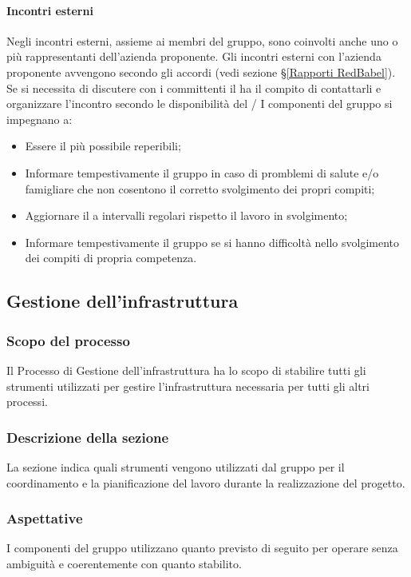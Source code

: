 \paragraph*{Incontri esterni}
Negli incontri esterni, assieme ai membri del gruppo, sono coinvolti anche uno o più rappresentanti dell'azienda proponente.
Gli incontri esterni con l'azienda proponente avvengono secondo gli accordi (vedi sezione \S\ref{Rapporti RedBabel}). Se si necessita di discutere con i committenti il \Responsabile ha il compito di contattarli e organizzare l'incontro secondo le disponibilità del \VT/\CR
{}
I componenti del gruppo si impegnano a:
\begin{itemize}
	\item Essere il più possibile reperibili;
	\item Informare tempestivamente il gruppo in caso di promblemi di salute e/o famigliare che non cosentono il corretto svolgimento dei propri compiti;
	\item Aggiornare il \Responsabile a intervalli regolari rispetto il lavoro in svolgimento;
	\item Informare tempestivamente il gruppo se si hanno difficoltà nello svolgimento dei compiti di propria competenza.
\end{itemize}

\subsection{Gestione dell'infrastruttura}
\subsubsection{Scopo del processo}
Il Processo di Gestione dell'infrastruttura ha lo scopo di stabilire tutti gli strumenti utilizzati per gestire l'infrastruttura necessaria per tutti gli altri processi.
\subsubsection{Descrizione della sezione}
La sezione indica quali strumenti vengono utilizzati dal gruppo per il coordinamento e la pianificazione del lavoro durante la realizzazione del progetto.
\subsubsection{Aspettative}
I componenti del gruppo utilizzano quanto previsto di seguito per operare senza ambiguità e coerentemente con quanto stabilito.
